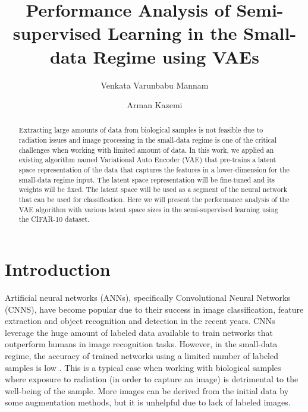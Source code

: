 \documentclass[sigconf, authorversion]{acmart}
\newcommand{\etal}{\textit{et}\ \textit{al}.}
\begin{document}
\title{Performance Analysis of Semi-supervised Learning in the Small-data Regime using VAEs}

\author{Venkata Varunbabu Mannam}

\author{Arman Kazemi}
\renewcommand{\shortauthors}{Mannam and Kazemi, \etal}

\begin{abstract}
Extracting large amounts of data from biological samples is not feasible due to radiation issues and image processing in the small-data regime is one of the critical challenges when working with limited amount of data. In this work, we applied an existing algorithm named Variational Auto Encoder (VAE) that pre-trains a latent space representation of the data that captures the features in a lower-dimension for the small-data regime input. The latent space representation will be fine-tuned and its weights will be fixed. The latent space will be used as a segment of the neural network that can be used for classification. Here we will present the performance analysis of the VAE algorithm with various latent space sizes in the semi-supervised learning using the CIFAR-10 dataset.\end{abstract}






\maketitle

\section{Introduction}

Artificial neural networks (ANNs), specifically Convolutional Neural Networks (CNNS), have become popular due to their success in image classification, feature extraction and object recognition and detection \cite{goodfellow2016deep} in the recent years. CNNs leverage the huge amount of labeled data available to train networks that outperform humans in image recognition tasks. However, in the small-data regime, the accuracy of trained networks using a limited number of labeled samples is low \cite{chawla2005learning}. This is a typical case when working with biological samples where exposure to radiation (in order to capture an image) is detrimental to the well-being of the sample. More images can be derived from the initial data by some augmentation methods, but it is unhelpful due to lack of labeled images.
\end{document}
